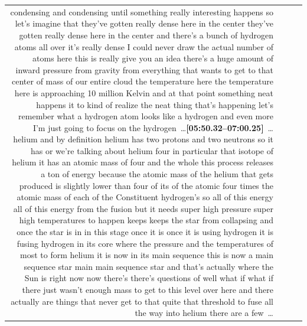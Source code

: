 \documentclass[10pt]{article}
\begin{document}
\begin{tiny}
\begin{longtable}{r p{0.3in} p{1.212in} p{3.8in}}
condensing and condensing until something really interesting happens so let's imagine that they've gotten really dense here in the center they've gotten really dense here in the center and there's a bunch of hydrogen atoms all over it's really dense I could never draw the actual number of atoms here this is really give you an idea there's a huge amount of inward pressure from gravity from everything that wants to get to that center of mass of our entire cloud the temperature here the temperature here is approaching 10 million Kelvin and at that point something neat happens it to kind of realize the neat thing that's happening let's remember what a hydrogen atom looks like a hydrogen and even more I'm just going to focus on the hydrogen~\ldots\smallskip\newline\textbf{[05:50.32--07:00.25]}~\ldots helium and by definition helium has two protons and two neutrons so it has or we're talking about helium four in particular that isotope of helium it has an atomic mass of four and the whole this process releases a ton of energy because the atomic mass of the helium that gets produced is slightly lower than four of its of the atomic four times the atomic mass of each of the Constituent hydrogen's so all of this energy all of this energy from the fusion but it needs super high pressure super high temperatures to happen keeps keeps the star from collapsing and once the star is in in this stage once it is once it is using hydrogen it is fusing hydrogen in its core where the pressure and the temperatures of most to form helium it is now in its main sequence this is now a main sequence star main main sequence star and that's actually where the Sun is right now now there's there's questions of well what if what if there just wasn't enough mass to get to this level over here and there actually are things that never get to that quite that threshold to fuse all the way into helium there are a few~\ldots \\

\end{longtable}
\end{tiny}
\end{document}
